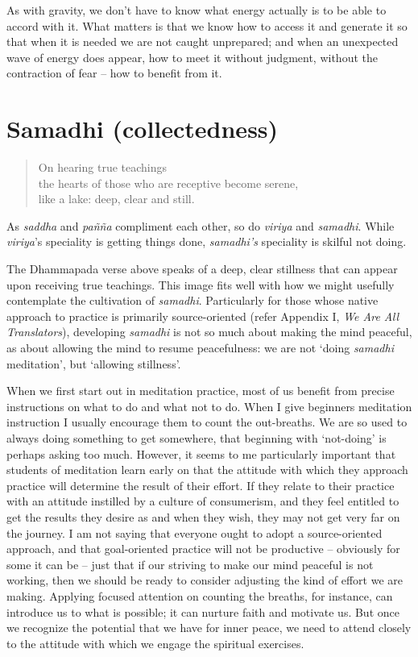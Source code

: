 As with gravity, we don't have to know what energy actually is to be
able to accord with it. What matters is that we know how to access it
and generate it so that when it is needed we are not caught unprepared;
and when an unexpected wave of energy does appear, how to meet it
without judgment, without the contraction of fear -- how to benefit from
it.

\clearpage

\section{Samadhi (collectedness)}

\begin{quote}
  On hearing true teachings\\
  the hearts of those who are receptive become serene,\\
  like a lake: deep, clear and still.

\end{quote}

As \emph{saddha} and \emph{pañña} compliment each other, so do
\emph{viriya} and \emph{samadhi}. While \emph{viriya}'s speciality is
getting things done, \emph{samadhi's} speciality is skilful not doing.

The Dhammapada verse above speaks of a deep, clear stillness that can
appear upon receiving true teachings. This image fits well with how we
might usefully contemplate the cultivation of \emph{samadhi}.
Particularly for those whose native approach to practice is primarily
source-oriented (refer Appendix I, \emph{We Are All Translators}),
developing \emph{samadhi} is not so much about making the mind peaceful,
as about allowing the mind to resume peacefulness: we are not `doing
\emph{samadhi} meditation', but `allowing stillness'.

When we first start out in meditation practice, most of us benefit from
precise instructions on what to do and what not to do. When I give
beginners meditation instruction I usually encourage them to count the
out-breaths. We are so used to always doing something to get somewhere,
that beginning with `not-doing' is perhaps asking too much. However, it
seems to me particularly important that students of meditation learn
early on that the attitude with which they approach practice will
determine the result of their effort. If they relate to their practice
with an attitude instilled by a culture of consumerism, and they feel
entitled to get the results they desire as and when they wish, they may
not get very far on the journey. I am not saying that everyone ought to
adopt a source-oriented approach, and that goal-oriented practice will
not be productive -- obviously for some it can be -- just that if our
striving to make our mind peaceful is not working, then we should be
ready to consider adjusting the kind of effort we are making. Applying
focused attention on counting the breaths, for instance, can introduce
us to what is possible; it can nurture faith and motivate us. But once
we recognize the potential that we have for inner peace, we need to
attend closely to the attitude with which we engage the spiritual
exercises.


